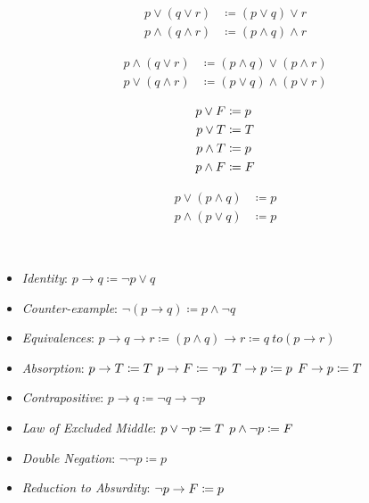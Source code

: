 \begin{definition}
\begin{align}
    p \lor (q \lor r) &\coloneqq (p \lor q) \lor r \\
    p \land (q \land r) &\coloneqq (p \land q) \land r
\end{align}
\end{definition}

\begin{definition}
\begin{align}
    p \land (q \lor r) &\coloneqq (p \land q) \lor (p \land r) \\
    p \lor (q \land r) &\coloneqq (p \lor q) \land (p \lor r)
\end{align}
\end{definition}

\begin{definition}
\begin{align}
    p \lor \relax{F} &\coloneqq p \\
    p \lor \relax{T} &\coloneqq \relax{T} \\
    p \land \relax{T} &\coloneqq p \\
    p \land \relax{F} &\coloneqq \relax{F}
\end{align}
\end{definition}

\begin{definition}
\begin{align}
    p \lor (p \land q) &\coloneqq p \\
    p \land (p \lor q) &\coloneqq p
\end{align}
\end{definition}

\begin{definition}\ \\
\begin{itemize}
    \item \textit{Identity}: $p \to q \coloneqq \neg p \lor q$
    \item \textit{Counter-example}: $\neg(p \to q) \coloneqq p \land \neg q$
    \item \textit{Equivalences}: $p \to q \to r \coloneqq (p \land q) \to r \coloneqq q\ to (p \to r)$
    \item \textit{Absorption}:
        \subitem $p \to \relax{T} \coloneqq T$
        \subitem $p \to \relax{F} \coloneqq \neg p$
        \subitem $\relax{T} \to p \coloneqq p$
        \subitem $\relax{F} \to p \coloneqq T$
    \item \textit{Contrapositive}: $p \to q \coloneqq \neg q \to \neg p$
    \item \textit{Law of Excluded Middle}: 
        \subitem $p \lor \neg p \coloneqq \relax{T}$
        \subitem $p \land \neg p \coloneqq \relax{F}$
    \item \textit{Double Negation}: $\neg \neg p \coloneqq p$
    \item \textit{Reduction to Absurdity}: $\neg p \to \relax{F} \coloneqq p$
\end{itemize}
\end{definition}

